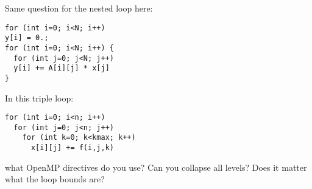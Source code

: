 \begin{exercise}
  Same question for the nested loop here:

\begin{lstlisting}
for (int i=0; i<N; i++)
y[i] = 0.;
for (int i=0; i<N; i++) {
  for (int j=0; j<N; j++)
  y[i] += A[i][j] * x[j]
}
\end{lstlisting}
\end{exercise}

\begin{exercise}
  In this triple loop:
\begin{lstlisting}
for (int i=0; i<n; i++)
  for (int j=0; j<n; j++)
    for (int k=0; k<kmax; k++)
      x[i][j] += f(i,j,k)
\end{lstlisting}
what OpenMP directives do you use?
Can you collapse all levels?
Does it matter what the loop bounds are?
\end{exercise}
